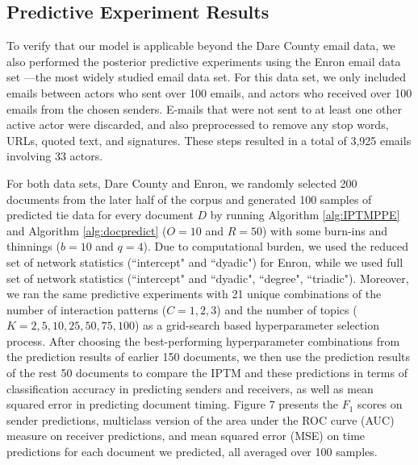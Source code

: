 \documentclass[a4paper]{article}
\begin{document}
\subsection{Predictive Experiment Results}
To verify that our model is applicable beyond the Dare County email data, we also performed the posterior predictive experiments using the Enron email data set ---the most widely studied email data set. For this data set, we only included emails between actors who sent over 100 emails, and actors who received over 100 emails from the chosen senders. E-mails that were not sent to at least one other active actor were discarded, and also preprocessed to remove any stop words, URLs, quoted text, and signatures. These steps resulted in a total of 3,925 emails involving 33 actors. 

For both data sets, Dare County and Enron, we randomly selected 200 documents from the later half of the corpus and generated 100 samples of predicted tie data for every document $D$ by running Algorithm \ref{alg:IPTMPPE} and Algorithm \ref{alg:docpredict} ($O = 10$ and $R = 50$) with some burn-ins and thinnings ($b = 10$ and $q = 4$). Due to computational burden, we used the reduced set of network statistics (``intercept" and ``dyadic") for Enron, while we used full set of network statistics (``intercept" and ``dyadic", ``degree", ``triadic"). Moreover, we ran the same predictive experiments with 21 unique combinations of the number of interaction patterns ($C = 1, 2, 3$) and the number of topics ($K = 2, 5, 10, 25, 50, 75, 100$) as a grid-search based hyperparameter selection process. After choosing the best-performing hyperparameter combinations from the prediction results of earlier 150 documents, we then use the prediction results of the rest 50 documents to compare the IPTM and these predictions in terms of classification accuracy in predicting senders and receivers, as well as mean squared error in predicting document timing. Figure 7 presents the $F_1$ scores on sender predictions, multiclass version of the area under the ROC curve (AUC) measure \citep{hand2001simple} on receiver predictions, and mean squared error (MSE) on time predictions for each document we predicted, all averaged over 100 samples. 
\end{document}
